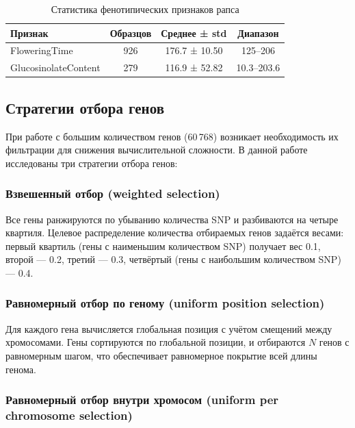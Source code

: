 \begin{table}
	\centering
	\caption{Статистика фенотипических признаков рапса}
	\label{tab:rapeseed_phenotype}
	\begin{tabular}{|l|c|c|c|}
		\hline
		\textbf{Признак} & \textbf{Образцов} & \textbf{Среднее ± std} & \textbf{Диапазон} \\ \hline
		FloweringTime & 926 & 176.7 ± 10.50 & 125–206 \\ \hline
		GlucosinolateContent & 279 & 116.9 ± 52.82 & 10.3–203.6 \\ \hline
	\end{tabular}
\end{table}

\subsection{Стратегии отбора генов}

При работе с большим количеством генов (60\,768) возникает необходимость 
их фильтрации для снижения вычислительной сложности. В данной работе 
исследованы три стратегии отбора генов:

\subsubsection{Взвешенный отбор (weighted selection)}

Все гены ранжируются по убыванию количества SNP и разбиваются на четыре 
квартиля. Целевое распределение количества отбираемых генов задаётся 
весами: первый квартиль (гены с наименьшим количеством SNP) получает 
вес 0.1, второй — 0.2, третий — 0.3, четвёртый (гены с наибольшим 
количеством SNP) — 0.4.

\subsubsection{Равномерный отбор по геному (uniform position selection)}

Для каждого гена вычисляется глобальная позиция с учётом смещений 
между хромосомами. Гены сортируются по глобальной позиции, и отбираются 
$N$ генов с равномерным шагом, что обеспечивает равномерное покрытие 
всей длины генома.

\subsubsection{Равномерный отбор внутри хромосом (uniform per chromosome selection)}

